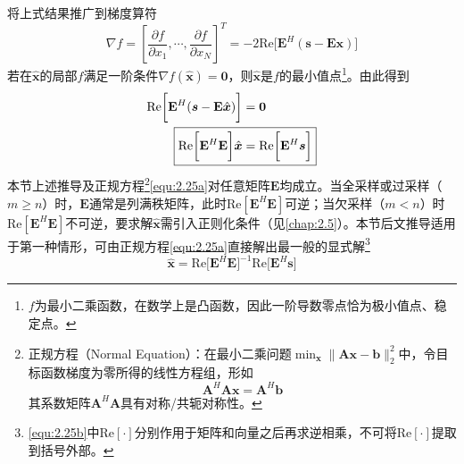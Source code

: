 \documentclass[12pt]{article}
\begin{document}
将上式结果推广到梯度算符
\begin{equation}
    \nabla f=\left[\frac{\partial f}{\partial x_1},\cdots,\frac{\partial f}{\partial x_N}\right]^T=-2\mathrm{Re}\bigg[\mathbf{E}^H(\bm{s}-\mathbf{E}\bm{x})\bigg]
    \label{equ:2.25}
\end{equation}
若在$\hat{\bm{x}}$的局部$f$满足一阶条件$\nabla f(\hat{\bm{x}})=\bm{0}$，则$\hat{\bm{x}}$是$f$的最小值点\footnote{$f$为最小二乘函数，在数学上是凸函数，因此一阶导数零点恰为极小值点、稳定点。}。由此得到
\begin{align}
    \mathrm{Re}\bigg[\mathbf{E}^H(\bm{s}-\mathbf{E}\hat{\bm{x}})\bigg]&=\bm{0} \\
    \Aboxed{\mathrm{Re}\bigg[\mathbf{E}^H\mathbf{E}\bigg]\hat{\bm{x}}&=\mathrm{Re}\bigg[\mathbf{E}^H\bm{s}\bigg]}
    \label{equ:2.25a}
\end{align}
本节上述推导及正规方程\footnote{正规方程（Normal Equation）：在最小二乘问题$\min_{\bm{x}}\|\mathbf{A}\bm{x}-\bm{b}\|_2^2$中，令目标函数梯度为零所得的线性方程组，形如
\begin{equation}
    \mathbf{A}^H\mathbf{A}\bm{x}=\mathbf{A}^H\bm{b}
\end{equation}
其系数矩阵$\mathbf{A}^H\mathbf{A}$具有对称/共轭对称性。}\autoref{equ:2.25a}对任意矩阵$\mathbf{E}$均成立。当全采样或过采样（$m\ge n$）时，$\mathbf{E}$通常是列满秩矩阵，此时$\mathrm{Re}[\mathbf{E}^H\mathbf{E}]$可逆；当欠采样（$m<n$）时$\mathrm{Re}[\mathbf{E}^H\mathbf{E}]$不可逆，要求解$\hat{\bm{x}}$需引入正则化条件（见\autoref{chap:2.5}）。本节后文推导适用于第一种情形，可由正规方程\autoref{equ:2.25a}直接解出最一般的显式解\footnote{\autoref{equ:2.25b}中$\mathrm{Re}[\cdot]$分别作用于矩阵和向量之后再求逆相乘，不可将$\mathrm{Re}[\cdot]$提取到括号外部。}
\begin{equation}
    \hat{\bm{x}}=\mathrm{Re}\bigg[\mathbf{E}^H\mathbf{E}\bigg]^{-1}\mathrm{Re}\bigg[\mathbf{E}^H\bm{s}\bigg]
    \label{equ:2.25b}
\end{equation}
\end{document}
